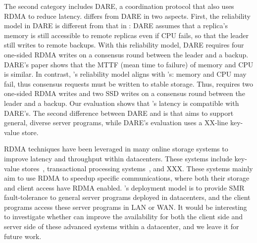 The second category includes DARE, a coordination protocol that also uses RDMA 
to reduce latency. \xxx differs from DARE in two aspects. First, 
the reliability model in DARE is different from that in \paxos: DARE assumes 
that a replica's memory is still accessible to remote replicas even if CPU 
fails, so that the leader still writes to remote backups. With this reliability 
model, DARE requires four one-sided RDMA writes on a consensus round between the 
leader and a backup. DARE's paper shows that the MTTF (mean time to failure) of 
memory and CPU is similar. In contrast, \xxx's reliability model aligns with 
\paxos's: memory and CPU may fail, thus consensus requests must be written to 
stable storage. Thus, \xxx requires two one-sided RDMA writes and two SSD writes 
on a consensus round between the leader and a backup. Our evaluation shows that 
\xxx's latency is compatible with DARE's. The second difference between DARE 
and \xxx is that \xxx aims to support general, diverse server programs, while 
DARE's evaluation uses a XX-line key-value store.





 RDMA techniques have been leveraged in many online 
storage systems to improve latency and throughput within datacenters. These 
systems include key-value stores~\cite{jinyang,herd,farm}, transactional 
processing systems~\cite{haibo,microsoft:sosp15}, and XXX. These systems mainly 
aim to use RDMA to speedup specific communications, where both their storage 
and client access have RDMA enabled. \xxx's deployment model is to provide 
SMR fault-tolerance to general server programs deployed in datacenters, and the 
client programs access these server programs in LAN or WAN. It 
would be interesting to investigate whether \xxx can improve the availability 
for both the client side and server side of these advanced systems within a 
datacenter, and we leave it for future work.




